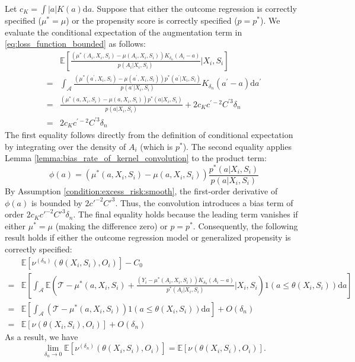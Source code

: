 \documentclass[12pt]{article}
\newcommand{\E}{\mathbb{E}}
\begin{document}
\noindent Let $c_K = \int |a|K(a)\mathrm{d}a$. Suppose that either the outcome regression is correctly specified ($\mu^* = \mu$) or the propensity score is correctly specified ($p = p^*$). We evaluate the conditional expectation of the augmentation term in \eqref{eq:loss_function_bounded} as follows:
\begin{align*}    &\E\left[\frac{(\mu^*(A_i,X_i,S_i) - \mu(A_i,X_i,S_i))K_{\delta_n}(A_i-a)}{p(A_{i}|X_{i},S_{i})}\bigg| X_i,S_i\right]\\
    = & \int_{\mathcal{A}}\frac{(\mu^*(a^\prime,X_i,S_i) - \mu(a^\prime,X_i,S_i))p^*(a^\prime|X_{i},S_{i})}{p(a^\prime|X_{i},S_{i})}K_{\delta_n}(a^\prime-a)\mathrm{d}a^\prime\\
    = & \frac{(\mu^*(a,X_i,S_i) - \mu(a,X_i,S_i))p^*(a|X_{i},S_{i})}{p(a|X_{i},S_{i})} + 2c_K c^{\prime-2}C^{\prime 3}\delta_n\\
    =& 2c_K c^{\prime-2}C^{\prime 3}\delta_n
\end{align*}
The first equality follows directly from the definition of conditional expectation by integrating over the density of $A_i$ (which is $p^*$). The second equality applies Lemma \ref{lemma:bias_rate_of_kernel_convolution} to the product term:$$\phi(a) = (\mu^*(a, X_i, S_i) - \mu(a, X_i, S_i)) \frac{p^*(a | X_i, S_i)}{p(a | X_i, S_i)}$$By Assumption \ref{condition:excess_risk:smooth}, the first-order derivative of $\phi(a)$ is bounded by $2c'^{-2}C'^{3}$. Thus, the convolution introduces a bias term of order $2c_K c'^{-2}C'^{3} \delta_n$. The final equality holds because the leading term vanishes if either $\mu^* = \mu$ (making the difference zero) or $p = p^*$. Consequently, the following result holds  if either the outcome regression model or generalized propensity is correctly specified:
\begin{align*}
   &\E[\nu^{(\delta_n)}(\theta(X_i,S_i),O_i)] - C_0 \\
   = &\E\left[ \int_{\mathcal{A}} \E\left(\mathcal{T} - \mu^*(a,X_i,S_i)+ \frac{(Y_i - \mu^*(A_i,X_i,S_i))K_{\delta_n}(A_i-a)}{p^*(A_{i}|X_{i},S_{i})}\bigg| X_i,S_i\right)1(a\leq \theta(X_i,S_i))\mathrm{d}a\right]\\
   = & \E\left[\int_{\mathcal{A}}\left(\mathcal{T} - \mu^*(a,X_i,S_i)\right)1(a\leq \theta(X_i,S_i))\mathrm{d}a\right] + O(\delta_n)\\
   = & \E\left[\nu(\theta(X_i,S_i),O_i)\right] + O(\delta_n)
\end{align*}
As a result, we have $$\lim_{{\delta_n\rightarrow 0}}\E[\nu^{(\delta_n)}(\theta(X_i,S_i),O_i)] = \E[\nu(\theta(X_i,S_i),O_i)].$$
\end{document}
